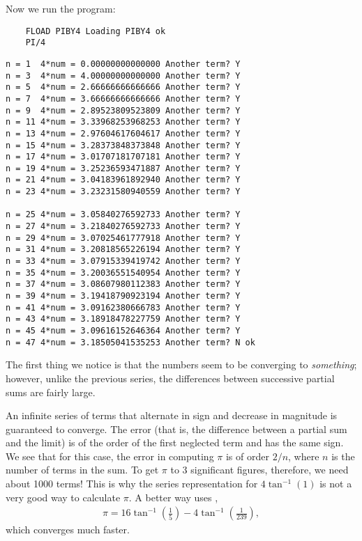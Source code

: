 Now we run the program:

\begin{lstlisting}
    FLOAD PIBY4 Loading PIBY4 ok
    PI/4
\end{lstlisting}
\begin{multicols}{2}
\begin{lstlisting}[basicstyle=\tiny,]
n = 1  4*num = 0.00000000000000 Another term? Y
n = 3  4*num = 4.00000000000000 Another term? Y
n = 5  4*num = 2.66666666666666 Another term? Y
n = 7  4*num = 3.66666666666666 Another term? Y
n = 9  4*num = 2.89523809523809 Another term? Y
n = 11 4*num = 3.33968253968253 Another term? Y
n = 13 4*num = 2.97604617604617 Another term? Y
n = 15 4*num = 3.28373848373848 Another term? Y
n = 17 4*num = 3.01707181707181 Another term? Y
n = 19 4*num = 3.25236593471887 Another term? Y
n = 21 4*num = 3.04183961892940 Another term? Y
n = 23 4*num = 3.23231580940559 Another term? Y

n = 25 4*num = 3.05840276592733 Another term? Y
n = 27 4*num = 3.21840276592733 Another term? Y
n = 29 4*num = 3.07025461777918 Another term? Y
n = 31 4*num = 3.20818565226194 Another term? Y
n = 33 4*num = 3.07915339419742 Another term? Y
n = 35 4*num = 3.20036551540954 Another term? Y
n = 37 4*num = 3.08607980112383 Another term? Y
n = 39 4*num = 3.19418790923194 Another term? Y
n = 41 4*num = 3.09162380666783 Another term? Y
n = 43 4*num = 3.18918478227759 Another term? Y
n = 45 4*num = 3.09616152646364 Another term? Y
n = 47 4*num = 3.18505041535253 Another term? N ok
\end{lstlisting}
\end{multicols}

The first thing we notice is that the numbers seem to be converging to \textit{something}; however, unlike the previous series, the differences between successive partial sums are fairly large.

An infinite series of terms that alternate in sign and decrease in magnitude is guaranteed to converge. The error (that is, the difference between a partial sum and the limit) is of the order of the first neglected term and has the same sign. We see that for this case, the error in computing $\pi$ is of order $2/n$, where $n$ is the number of terms in the sum. To get $\pi$ to 3 significant figures, therefore, we need about 1000 terms! This is why the series representation for $4\tan^{-1}{(1)}$ is not a very good way to calculate $\pi$. A better way uses \eg,
\begin{align*}
    \pi = 16\tan^{-1}\left ( \frac{1}{5}\right ) - 4\tan^{-1}\left(\frac{1}{239}\right) ,
\end{align*}
which converges much faster.

